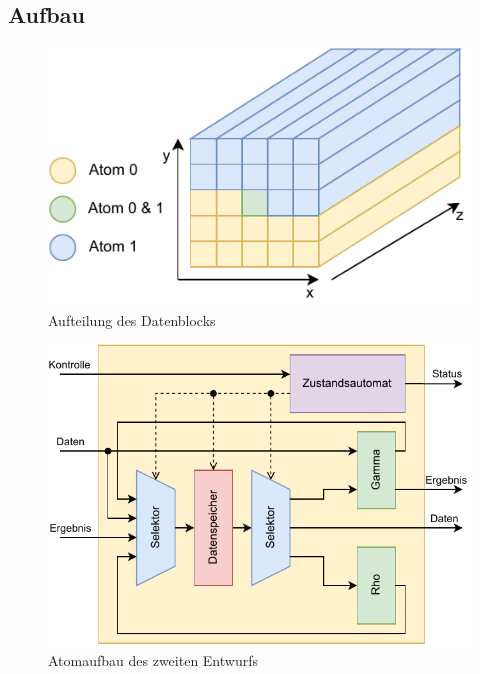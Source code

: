 \subsection{Aufbau}
\begin{figure}
	\center
	\includegraphics{images/Datenaufteilung_Iteration_2.pdf}
	\caption{Aufteilung des Datenblocks}
	\label{fig:datenaufteilung}
\end{figure}
\begin{figure}
	\center
	\includegraphics{images/Iteration_2.pdf}
	\caption{Atomaufbau des zweiten Entwurfs}
	\label{fig:aufbau_iteration_2}
\end{figure}

